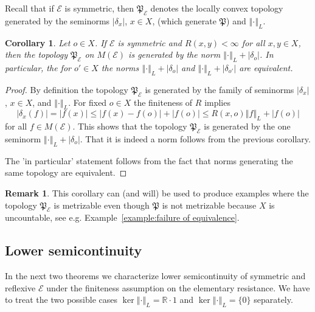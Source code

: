 \documentclass[a4paper,11pt,reqno]{amsart}
\newtheorem{corollary}[lemma]{Corollary}
\theoremstyle{definition}
\newtheorem{remark}[lemma]{Remark}
\numberwithin{equation}{section}
\newcommand{\cE}{{\mathcal E}}
\newcommand{\R}{{\mathbb R}}
\newcommand{\av}[1]{\left\Vert #1\right\Vert}
\newcommand{\1}{\mathds{1}}
\begin{document}
Recall that if $\cE$ is symmetric, then $\mathfrak{P}_\cE$ denotes the locally convex topology generated by the seminorms $|\delta_x|$, $x \in X$, (which generate $\mathfrak P$) and $\av{\cdot}_L$. 


\begin{corollary}\label{coro:metrizability form topology}
 Let $o \in X$. If $\cE$ is symmetric and $R(x,y) < \infty$ for all $x,y \in X$, then the topology $\mathfrak{P}_\cE$ on $M(\cE)$ is generated by the norm $\av{\cdot}_L  + |\delta_o|$.  In particular, the for $o' \in X$ the norms $\av{\cdot}_L  + |\delta_o|$ and $\av{\cdot}_L  + |\delta_{o'}|$ are equivalent. 
\end{corollary}
\begin{proof}
 By definition the topology $\mathfrak{P}_\cE$ is generated by the family of seminorms $|\delta_x|$, $x \in X$, and $\av{\cdot}_L$. For fixed $o \in X$ the finiteness of $R$ implies 
 $$|\delta_x(f)| = |f(x)| \leq |f(x) - f(o)| + |f(o)| \leq R(x,o) \av{f}_L + |f(o)|$$
 for all $f \in M(\cE)$. This shows that the topology $\mathfrak{P}_\cE$ is generated by the one seminorm $\av{\cdot}_L + |\delta_o|$. That it is indeed a norm follows from the previous corollary. 
 
 The 'in particular' statement follows from the fact that norms generating the same topology are equivalent.  
\end{proof}

 \begin{remark}
  This corollary can (and will) be used to produce examples where the topology $\mathfrak{P}_\cE$ is metrizable even though $\mathfrak{P}$ is not metrizable because $X$ is uncountable, see e.g. Example~\ref{example:failure of equivalence}.
 \end{remark}



\subsection{Lower semicontinuity}\label{subsection:lower semicontinuity}


In the next two theorems we characterize lower semicontinuity of symmetric and reflexive $\cE$ under the finiteness assumption on the elementary resistance. We have to treat the two possible cases $\ker \av{\cdot}_L = \R \cdot 1$ and $\ker \av{\cdot}_L = \{0\}$ separately. 
\end{document}
